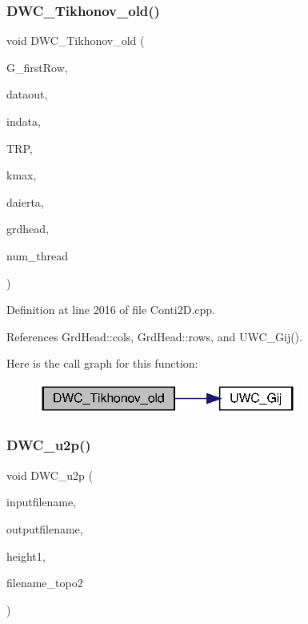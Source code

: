 \subsubsection{D\+W\+C\+\_\+\+Tikhonov\+\_\+old()}
{\footnotesize\ttfamily void D\+W\+C\+\_\+\+Tikhonov\+\_\+old (\begin{DoxyParamCaption}\item[{double $\ast$}]{G\+\_\+first\+Row,  }\item[{double $\ast$}]{dataout,  }\item[{double $\ast$}]{indata,  }\item[{double}]{T\+RP,  }\item[{int}]{kmax,  }\item[{double}]{daierta,  }\item[{\textbf{ Grd\+Head}}]{grdhead,  }\item[{int}]{num\+\_\+thread }\end{DoxyParamCaption})}



Definition at line 2016 of file Conti2\+D.\+cpp.



References Grd\+Head\+::cols, Grd\+Head\+::rows, and U\+W\+C\+\_\+\+Gij().

Here is the call graph for this function\+:\nopagebreak
\begin{figure}[H]
\begin{center}
\leavevmode
\includegraphics[width=242pt]{Conti2D_8h_aca8df189bd3e80e2041b22f7691d87b0_aca8df189bd3e80e2041b22f7691d87b0_cgraph}
\end{center}
\end{figure}
\mbox{\label{Conti2D_8h_a4739a69e945a4a3422ec5dc9cbc8c5e3_a4739a69e945a4a3422ec5dc9cbc8c5e3}} 
\subsubsection{D\+W\+C\+\_\+u2p()}
{\footnotesize\ttfamily void D\+W\+C\+\_\+u2p (\begin{DoxyParamCaption}\item[{string}]{inputfilename,  }\item[{string}]{outputfilename,  }\item[{double}]{height1,  }\item[{string}]{filename\+\_\+topo2 }\end{DoxyParamCaption})}

